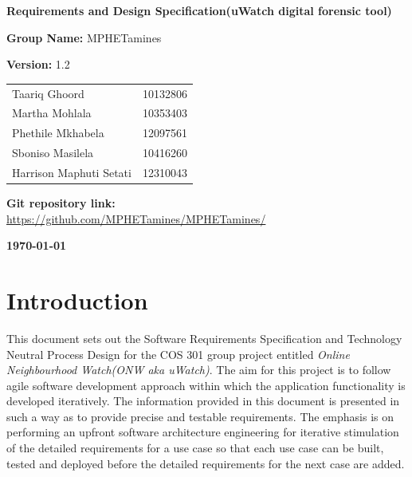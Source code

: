 \documentclass[a4paper,12pt]{article}
\begin{document}
\begin{center}

\Huge\textbf{Requirements and Design Specification(uWatch digital forensic tool)\\}
																											
\vspace{2 cm}

\LARGE\textbf{Group Name:} MPHETamines\newline
 
\LARGE\textbf{Version:} 1.2\newline
 
 
 
 
\vspace{0.5 cm}
\begin{tabular}{lr}
Taariq Ghoord&10132806
\\ 
Martha Mohlala&10353403
\\
Phethile Mkhabela&12097561
\\
Sboniso Masilela&10416260
\\
Harrison Maphuti Setati&12310043\\
\end{tabular}

\vspace{1cm}
\textbf{Git repository link:\\}
\url{https://github.com/MPHETamines/MPHETamines/}

\vspace{1cm}
\textbf{\today}
\end{center}
\newpage

\tableofcontents

\newpage
{}

\section{Introduction}
This document sets out the Software Requirements Specification and Technology Neutral Process Design for the COS 301 group project entitled \textit{Online Neighbourhood Watch(ONW aka uWatch)}.
The aim for this project is to follow agile software development approach within which the application functionality is developed 
iteratively. 
The information provided in this document is presented in such a way as to provide precise and testable requirements. The emphasis is on performing an upfront software 
architecture engineering for iterative stimulation of the detailed requirements for a use case so that each use case can be built, tested and deployed before the detailed 
requirements for the next case are added.
\end{document}
